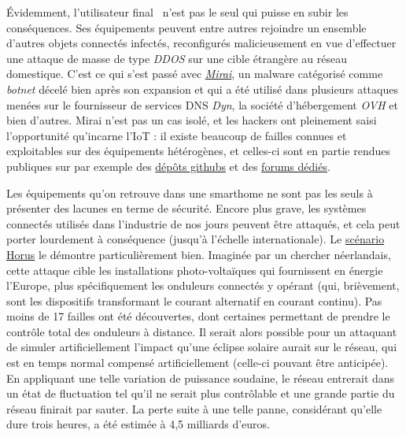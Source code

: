 \documentclass[]{article}
\begin{document}
\newpage

\par Évidemment, l'utilisateur \og final \fg \ n'est pas le seul qui puisse en subir les conséquences. Ses équipements peuvent entre autres rejoindre un ensemble d'autres  objets connectés infectés, reconfigurés malicieusement en vue d'effectuer une attaque de masse de type \textit{DDOS} sur une cible étrangère au réseau domestique. C'est ce qui s'est passé avec \href{https://en.wikipedia.org/wiki/Mirai_(malware)}{\textit{Mirai}}, un malware catégorisé comme  \textit{botnet} décelé bien après son expansion et qui a été utilisé dans plusieurs attaques menées sur le fournisseur de services DNS \textit{Dyn}, la société d'hébergement \textit{OVH} et bien d'autres. Mirai n'est pas un cas isolé, et les hackers ont pleinement saisi l'opportunité qu'incarne l'IoT : il existe beaucoup de failles connues et exploitables sur des équipements hétérogènes, et celles-ci sont en partie rendues publiques sur par exemple des \href{https://github.com/nebgnahz/awesome-iot-hacks}{dépôts githubs} et des \href{https://hackforums.net/forumdisplay.php?fid=193}{forums dédiés}.\\

\par Les équipements qu'on retrouve dans une smarthome ne sont pas les seuls à présenter des lacunes en terme de sécurité. Encore plus grave, les systèmes connectés utilisés dans l'industrie de nos jours peuvent être attaqués, et cela peut porter lourdement à conséquence (jusqu'à l'échelle internationale). Le \href{https://horusscenario.com/}{scénario Horus} le démontre particulièrement bien. Imaginée par un chercher néerlandais, cette attaque cible les installations photo-voltaïques qui fournissent en énergie l'Europe, plus spécifiquement les onduleurs connectés y opérant (qui, brièvement, sont les dispositifs transformant le courant alternatif en courant continu). Pas moins de 17 failles ont été découvertes, dont certaines permettant de prendre le contrôle total des onduleurs à distance. Il serait alors possible pour un attaquant de simuler artificiellement l'impact qu'une éclipse solaire aurait sur le réseau, qui est en temps normal compensé artificiellement (celle-ci pouvant être anticipée). En appliquant une telle variation de puissance soudaine, le réseau entrerait dans un état de fluctuation tel qu'il ne serait plus contrôlable et une grande partie du réseau finirait par sauter. La perte suite à une telle panne, considérant qu'elle dure trois heures, a été estimée à 4,5 milliards d'euros.
\end{document}
